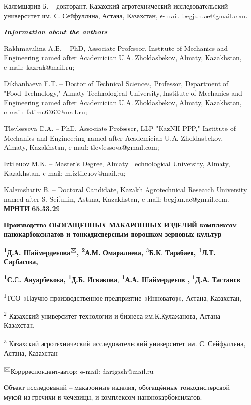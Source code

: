 Калемшарив Б. -- докторант, Казахский агротехнический исследовательский
университет им. С. Сейфуллина, Астана, Казахстан, е-mail:
begjan.ae@gmail.com.

\emph{{\bfseries Information about the authors}}

Rakhmatulina A.B. -- PhD, Associate Professor, Institute of Mechanics
and Engineering named after Academician U.A. Zholdasbekov, Almaty,
Kazakhstan, e-mail: kazrah@mail.ru;

Dikhanbaeva F.T. -- Doctor of Technical Sciences, Professor, Department
of "Food Technology," Almaty Technological University, Institute of
Mechanics and Engineering named after Academician U.A. Zholdasbekov,
Almaty, Kazakhstan, e-mail: fatima6363@mail.ru;

Tlevlessova D.A. -- PhD, Associate Professor, LLP "KazNII PPP,"
Institute of Mechanics and Engineering named after Academician U.A.
Zholdasbekov, Almaty, Kazakhstan, e-mail: tlevlessova@gmail.com;

Iztileuov M.K. -- Master's Degree, Almaty Technological University,
Almaty, Kazakhstan, e-mail: m.iztileuov@mail.ru;

Kalemshariv B. -- Doctoral Candidate, Kazakh Agrotechnical Research
University named after S. Seifullin, Astana, Kazakhstan, e-mail:
begjan.ae@gmail.com.\newpage
{\bfseries МРНТИ 65.33.29}

{\bfseries Производство ОБОГАЩЕННЫХ МАКАРОННЫХ ИЗДЕЛИЙ комплексом
нанокарбоксилатов и тонкодисперсным порошком зерновых культур}

{\bfseries \textsuperscript{1}Д.А. Шаймерденова\textsuperscript{🖂},
\textsuperscript{2}А.М. Омаралиева, \textsuperscript{3}Б.К. Тарабаев,
\textsuperscript{1}Л.Т. Сарбасова,}

{\bfseries \textsuperscript{1}С.С. Ануарбекова, \textsuperscript{1}Д.Б.
Искакова, \textsuperscript{1}А.А. Шаймерденов , \textsuperscript{1}Д.А.
Тастанов}

\textsuperscript{1}ТОО «Научно-производственное предприятие «Инноватор»,
Астана, Казахстан,

\textsuperscript{2} Казахский университет технологии и бизнеса
им.К.Кулажанова, Астана, Казахстан,

\textsuperscript{3} Казахский агротехнический исследовательский
университет им. С. Сейфуллина, Астана, Казахстан

\textsuperscript{🖂}Коррреспондент-автор: e-mail: darigash@mail.ru

Объект исследований -- макаронные изделия, обогащённые тонкодисперсной
мукой из гречихи и чечевицы, и комплексом нанонокарбоксилатов.

